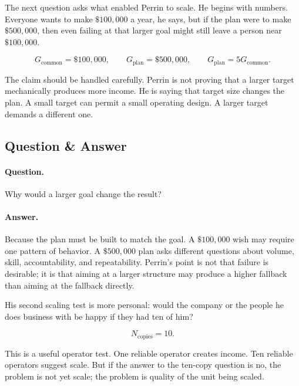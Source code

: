 The next question asks what enabled Perrin to scale. He begins with numbers. Everyone wants to make \(\$100{,}000\) a year, he says, but if the plan were to make \(\$500{,}000\), then even failing at that larger goal might still leave a person near \(\$100{,}000\).

\begin{equation}
G_{\mathrm{common}}=\$100{,}000,\qquad
G_{\mathrm{plan}}=\$500{,}000,\qquad
G_{\mathrm{plan}}=5G_{\mathrm{common}}.
\end{equation}

The claim should be handled carefully. Perrin is not proving that a larger target mechanically produces more income. He is saying that target size changes the plan. A small target can permit a small operating design. A larger target demands a different one.

\subsection{Question \& Answer}

\paragraph{Question.}
Why would a larger goal change the result?

\paragraph{Answer.}
Because the plan must be built to match the goal. A \(\$100{,}000\) wish may require one pattern of behavior. A \(\$500{,}000\) plan asks different questions about volume, skill, accountability, and repeatability. Perrin's point is not that failure is desirable; it is that aiming at a larger structure may produce a higher fallback than aiming at the fallback directly.

His second scaling test is more personal: would the company or the people he does business with be happy if they had ten of him?

\begin{equation}
N_{\mathrm{copies}}=10.
\end{equation}

This is a useful operator test. One reliable operator creates income. Ten reliable operators suggest scale. But if the answer to the ten-copy question is no, the problem is not yet scale; the problem is quality of the unit being scaled.

